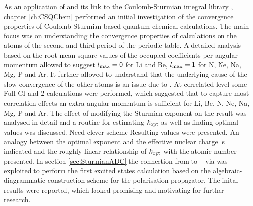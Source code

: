 As an application of \molsturm and its link to the
Coulomb-Sturmian integral library \sturmint,
chapter \ref{ch:CSQChem} performed an initial investigation
of the convergence properties of Coulomb-Sturmian-based
quantum-chemical calculations.
The main focus was on understanding the convergence
properties of \HF calculations on the atoms
of the second and third period of the periodic table.
A detailed analysis based on the root mean square values
of the occupied coefficients per angular momentum
allowed to suggest $l_\text{max} = 0$ for Li and Be,
$l_\text{max} = 1$ for N, Ne, Na, Mg, P and Ar.
It further allowed to understand that the
underlying cause of the slow convergence of the other
atoms is an issue due to \UHF.
At correlated level some Full-CI and {\MP}2 calculations
were performed,
which suggested that to capture most correlation effects
an extra angular momentum is sufficient
for Li, Be, N, Ne, Na, Mg, P and Ar.
The effect of modifying the Sturmian exponent on the result
was analysed in detail
and a routine for estimating $k_\text{opt}$ as well as finding
optimal values was discussed.
Need clever scheme%
Resulting values were presented.
%
An analogy between the optimal exponent and
the effective nuclear charge is indicated and the roughly
linear relationship of $k_\text{opt}$ with the atomic number presented.
%
In section \ref{sec:SturmianADC} the connection from
\molsturm to \adcman~\cite{Wormit2014} via \python
was exploited to perform the first
excited states calculation based on the algebraic-diagrammatic construction
scheme for the polarisation propagator.
The inital results were reported,
which looked promising and motivating for further research.
